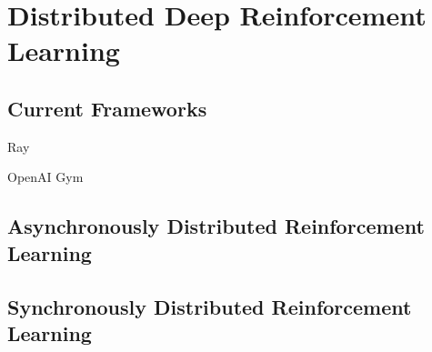 
\chapter{Distributed Deep Reinforcement Learning}\label{chapter:Distributed Deep Reinforcement Learning}


\section{Current Frameworks}

Ray ~\parencite{DBLP:journals/corr/abs-1712-05889}

OpenAI Gym ~\parencite{DBLP:journals/corr/BrockmanCPSSTZ16}

\section{Asynchronously Distributed Reinforcement Learning}

\section{Synchronously Distributed Reinforcement Learning}
